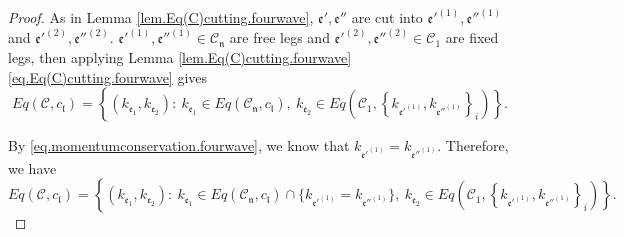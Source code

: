 \begin{proof}
    As in Lemma \ref{lem.Eq(C)cutting.fourwave}, $\mathfrak{e}', \mathfrak{e}''$ are cut into $\mathfrak{e}'^{(1)}, \mathfrak{e}''^{(1)}$
    and $\mathfrak{e}'^{(2)}, \mathfrak{e}''^{(2)}$. $\mathfrak{e}'^{(1)}, \mathfrak{e}''^{(1)}\in \mathcal{C}_{\mathfrak{n}}$ are free legs and $\mathfrak{e}'^{(2)}, \mathfrak{e}''^{(2)}\in \mathcal{C}_1$ are fixed legs, then applying Lemma \ref{lem.Eq(C)cutting.fourwave} \eqref{eq.Eq(C)cutting.fourwave} gives
    \begin{equation}
     Eq(\mathcal{C},c_{\mathfrak{l}})=\left\{(k_{\mathfrak{e}_1},k_{\mathfrak{e}_{2}}):\ k_{\mathfrak{e}_1}\in Eq(\mathcal{C}_{\mathfrak{n}},c_{\mathfrak{l}}),\  k_{\mathfrak{e}_{2}}\in Eq\left(\mathcal{C}_1, \left\{k_{\mathfrak{e}'^{(1)}}, k_{\mathfrak{e}''^{(1)}}\right\}_{i}\right)\right\}.
    \end{equation}
    
    By \eqref{eq.momentumconservation.fourwave}, we know that $k_{\mathfrak{e}'^{(1)}}=k_{\mathfrak{e}''^{(1)}}$. Therefore, we have 
    \begin{equation}\label{eq.case1.2expand.fourwave}
     Eq(\mathcal{C},c_{\mathfrak{l}})=\left\{(k_{\mathfrak{e}_1},k_{\mathfrak{e}_{2}}):\ k_{\mathfrak{e}_1}\in Eq(\mathcal{C}_{\mathfrak{n}},c_{\mathfrak{l}})\cap \{k_{\mathfrak{e}'^{(1)}}=k_{\mathfrak{e}''^{(1)}}\},\  k_{\mathfrak{e}_{2}}\in Eq\left(\mathcal{C}_1, \left\{k_{\mathfrak{e}'^{(1)}}, k_{\mathfrak{e}''^{(1)}}\right\}_{i}\right)\right\}.
    \end{equation}
    

\end{proof}
